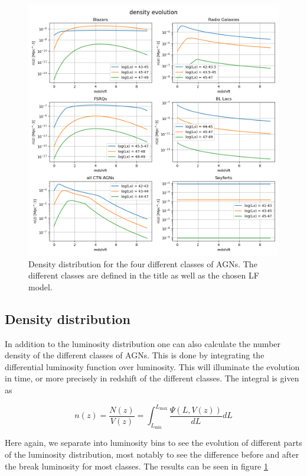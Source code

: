 \begin{figure}[H]
    \centering
    \includegraphics[width = \textwidth]{new_plots/Redshift density evolution.png}
    \caption{Density distribution for the four different classes of AGNs. The different classes are defined in the title as well as the chosen LF model.}
    \label{fig:DD}
\end{figure}



\subsection{Density distribution}

In addition to the luminosity distribution one can also calculate the number density of the different classes of AGNs. This is done by integrating the
differential luminosity function over luminosity. This will illuminate the evolution in time, or more precisely in redshift of the different classes. The integral is given as

\begin{equation}
    n(z) =\frac{N(z)}{V(z)} =  \int_{L_{\text{min}}}^{L_{\text{max}}} \frac{\Psi(L, V(z))}{dL} dL
\end{equation}

Here again, we separate into luminosity bins to see the evolution of different parts of the luminosity distribution, most notably to see the difference before and after the break luminosity for most classes. 
The results can be seen in figure \ref*{fig:DD}






